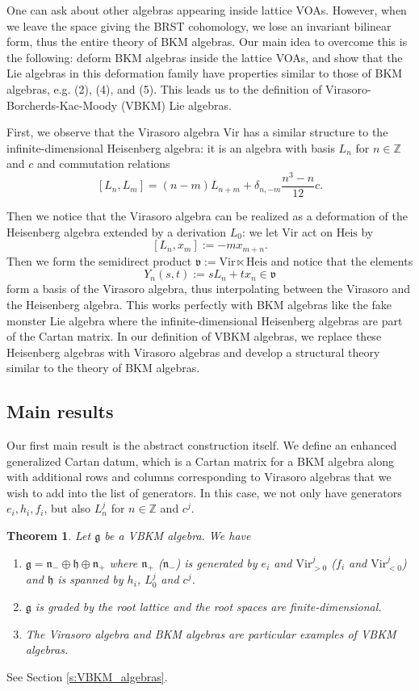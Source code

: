 \documentclass[11pt]{amsart}
\newcommand{\Z}{\mathbb{Z}}
\newcommand{\vv}{\mathfrak{v}}
\newcommand{\n}{\mathfrak{n}}
\newcommand{\g}{\mathfrak{g}}
\newcommand{\h}{\mathfrak{h}}
\newcommand{\Vir}{\mathrm{Vir}}
\newcommand{\Heis}{\mathrm{Heis}}
\numberwithin{equation}{section}
\theoremstyle{plain}
\newtheorem{theorem}{Theorem}[section]
\theoremstyle{definition}
\begin{document}
One can ask about other algebras appearing inside lattice VOAs. However, when we leave the space giving the BRST cohomology, we lose an invariant bilinear form, thus the entire theory of BKM algebras. Our main idea to overcome this is the following: deform BKM algebras inside the lattice VOAs, and show that the Lie algebras in this deformation family have properties similar to those of BKM algebras, e.g. (2), (4), and (5). This leads us to the definition of Virasoro-Borcherds-Kac-Moody (VBKM) Lie algebras.

First, we observe that the Virasoro algebra $\Vir$ has a similar structure to the infinite-dimensional Heisenberg algebra: it is an algebra with basis $L_n$ for $n\in\Z$ and $c$ and commutation relations
$$
[L_n,L_m]=(n-m)L_{n+m}+\delta_{n,-m}\frac{n^3-n}{12}c.
$$

Then we notice that the Virasoro algebra can be realized as a deformation of the Heisenberg algebra extended by a derivation $L_0$: we let $\Vir$ act on $\Heis$ by
$$
[L_n,x_m]:=-mx_{m+n}.
$$
Then we form the semidirect product $\vv:=\Vir\ltimes\Heis$ and notice that the elements 
$$
Y_n(s,t):=sL_n+tx_n\in\vv
$$
form a basis of the Virasoro algebra, thus interpolating between the Virasoro and the Heisenberg algebra. This works perfectly with BKM algebras like the fake monster Lie algebra where the infinite-dimensional Heisenberg algebras are part of the Cartan matrix. In our definition of VBKM algebras, we replace these Heisenberg algebras with Virasoro algebras and develop a structural theory similar to the theory of BKM algebras.


\subsection{Main results}
Our first main result is the abstract construction itself. We define an enhanced generalized Cartan datum, which is a Cartan matrix for a BKM algebra along with additional rows and columns corresponding to Virasoro algebras that we wish to add into the list of generators. In this case, we not only have generators $e_i,h_i,f_i$, but also $L_n^j$ for $n\in\Z$ and $c^j$.
\begin{theorem}
    Let $\g$ be a VBKM algebra. We have
    \begin{enumerate}[label=(\roman*)]
        \item $\g=\n_-\oplus\h\oplus\n_+$ where $\n_+$ ($\n_-$) is generated by $e_i$ and $\Vir_{>0}^j$ ($f_i$ and $\Vir_{<0}^j$) and $\h$ is spanned by $h_i$, $L_0^j$ and $c^j$.
        \item $\g$ is graded by the root lattice and the root spaces are finite-dimensional. 
        \item The Virasoro algebra and BKM algebras are particular examples of VBKM algebras.
    \end{enumerate}
\end{theorem}
See Section \ref{s:VBKM_algebras}. 
\end{document}
